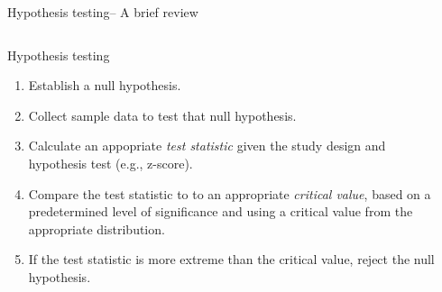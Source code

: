 \documentclass[ignorenonframetext,]{beamer}
\begin{document}
\begin{frame}{Hypothesis testing-- A brief review}

\begin{columns}
\begin{column}{0.65\textwidth}
\begin{block}{Hypothesis testing}
\begin{enumerate}
  \item Establish a null hypothesis.
  \item Collect sample data to test that null hypothesis.
  \item Calculate an appopriate \textit{test statistic} given the study design and hypothesis test (e.g., z-score).
  \item Compare the test statistic to to an appropriate \textit{critical value}, based on a predetermined level of significance and using a critical value from the appropriate distribution.
  \item If the test statistic is more extreme than the critical value, reject the null hypothesis.
\end{enumerate}
\end{block}
\end{column}

\begin{column}{0.35\textwidth}


\end{column}
\end{columns}
\end{frame}
\end{document}
